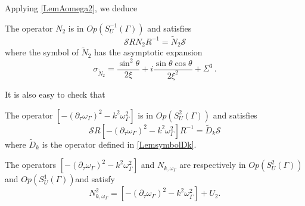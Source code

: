 \documentclass[a4paper]{article}
\begin{document}
Applying \autoref{LemAomega2}, we deduce
\begin{Cor}
	The operator $N_2$ is in $\textit{Op}(S^{-1}_U(\Gamma))$ and satisfies
	\[\mathcal{S} RN_2R^{-1} = \tilde{N}_2 \mathcal{S}\]
	where the symbol of $\tilde{N}_2$ has the asymptotic expansion
	\begin{equation}
		\sigma_{\tilde{N}_2} = \frac{\sin^2\theta}{2\xi} + i\frac{\sin\theta \cos \theta}{2 \xi^2} + \Sigma^3\,.
		\label{symboleN2}
	\end{equation}
\end{Cor}
\noindent It is also easy to check that
\begin{Lem}
	\label{LemsymbolDkBis}
	The operator $\left[-(\partial_\tau \omega_\Gamma )^2 - k^2\omega_\Gamma^2\right]$ is in $\textit{Op}(S_U^2(\Gamma))$ and satisfies 
	\[\mathcal{S} R\left[-(\partial_\tau \omega_\Gamma )^2 - k^2\omega_\Gamma^2\right]R^{-1}  = \tilde{D}_k \mathcal{S}\]
	where $\tilde{D}_k$ is the operator defined in \autoref{LemsymbolDk}.
\end{Lem}
\begin{The}
	\label{TheNkomega}
	The operators $\left[-(\partial_\tau \omega_\Gamma )^2 - k^2\omega_\Gamma^2\right]$ and  $N_{k,\omega_\Gamma}$ are respectively in $\textit{Op}(S^{2}_U(\Gamma))$ and $\textit{Op}(S^{1}_U(\Gamma))$and satisfy
	\[N_{k,\omega_\Gamma}^2 = \left[-(\partial_\tau \omega_\Gamma)^2 - k^2 \omega_\Gamma^2\right] + U_2. \]
\end{The}
\end{document}
